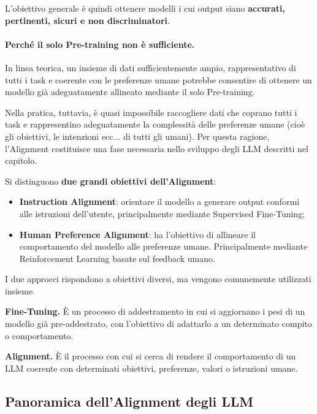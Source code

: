 L'obiettivo generale è quindi ottenere modelli i cui output siano
\textbf{accurati, pertinenti, sicuri e non discriminatori}.

\paragraph{Perché il solo Pre-training non è sufficiente.}
In linea teorica, un insieme di dati sufficientemente ampio,
rappresentativo di tutti i task e coerente con le preferenze umane
potrebbe consentire di ottenere un modello già adeguatamente
allineato mediante il solo Pre-training.

Nella pratica, tuttavia, è quasi impossibile raccogliere dati
che coprano tutti i task e rappresentino adeguatamente la
complessità delle preferenze umane (cioè gli obiettivi, le intenzioni ecc... di tutti gli umani). 
Per questa ragione,
l'Alignment costituisce una fase necessaria nello sviluppo
degli LLM descritti nel capitolo.

Si distinguono \textbf{due grandi obiettivi dell'Alignment}:

\begin{itemize}
    \item \textbf{Instruction Alignment}: orientare il modello
    a generare output conformi alle istruzioni dell'utente,
    principalmente mediante Supervised Fine-Tuning;

    \item \textbf{Human Preference Alignment}: ha l'obiettivo di allineare il comportamento del modello alle preferenze umane.
    Principalmente mediante Reinforcement Learning basate sul feedback umano.
\end{itemize}

I due approcci rispondono a obiettivi diversi, ma vengono
comunemente utilizzati insieme.


\begin{observation}
    \textbf{Fine-Tuning.} È un processo di addestramento in cui si
    aggiornano i pesi di un modello già pre-addestrato, con l'obiettivo
    di adattarlo a un determinato compito o comportamento.

    \medskip
    \noindent\textbf{Alignment.} È il processo con cui si cerca di
    rendere il comportamento di un LLM coerente con determinati
    obiettivi, preferenze, valori o istruzioni umane.
\end{observation}

\newpage
\subsection{Panoramica dell'Alignment degli LLM}

